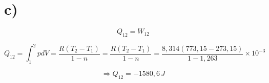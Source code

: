 

\section*{c)}

\[
Q_{12} = W_{12}
\]

\[
Q_{12} = \int_{1}^{2} p dV = \frac{R (T_2 - T_1)}{1 - n} = \frac{R \left( T_2 - T_1 \right)}{1 - n} = \frac{8,314 \left( 773,15 - 273,15 \right)}{1 - 1,263} \times 10^{-3}
\]

\[
\Rightarrow Q_{12} = - 1580,6 \, J
\]